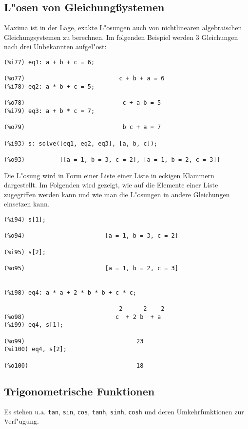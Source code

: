 \documentclass[spanish,12pt,a4paper]{article}
\begin{document}
\subsection{L"osen von Gleichung{\ss}ystemen}

Maxima ist in der Lage, exakte L"osungen auch von nichtlinearen algebraischen Gleichungsystemen zu berechnen. Im folgenden Beispiel werden 3 Gleichungen nach drei Unbekannten aufgel"ost:

\scriptsize
\begin{verbatim}
(%i77) eq1: a + b + c = 6;

(%o77)                           c + b + a = 6
(%i78) eq2: a * b + c = 5;

(%o78)                            c + a b = 5
(%i79) eq3: a + b * c = 7;

(%o79)                            b c + a = 7

(%i93) s: solve([eq1, eq2, eq3], [a, b, c]);

(%o93)          [[a = 1, b = 3, c = 2], [a = 1, b = 2, c = 3]]
\end{verbatim}
\normalsize

Die L"osung wird in Form einer Liste einer Liste in eckigen Klammern dargestellt. Im Folgenden wird gezeigt, wie auf die Elemente einer Liste zugegriffen werden kann und wie man die L"osungen in andere Gleichungen einsetzen kann.

\scriptsize
\begin{verbatim}
(%i94) s[1];

(%o94)                       [a = 1, b = 3, c = 2]

(%i95) s[2];

(%o95)                       [a = 1, b = 2, c = 3]


(%i98) eq4: a * a + 2 * b * b + c * c;

                                 2      2    2
(%o98)                          c  + 2 b  + a
(%i99) eq4, s[1];

(%o99)                                23
(%i100) eq4, s[2];

(%o100)                               18
\end{verbatim}
\normalsize

\subsection{Trigonometrische Funktionen}

Es stehen u.a. \verb|tan|, \verb|sin|, \verb|cos|, \verb|tanh|, \verb|sinh|, \verb|cosh| und deren Umkehrfunktionen zur Verf"ugung.
\end{document}
